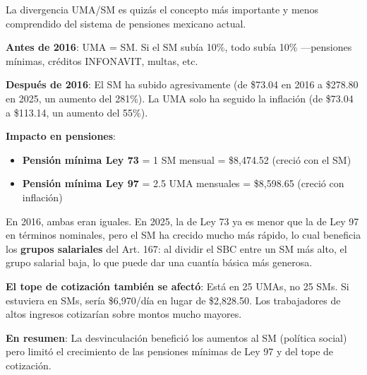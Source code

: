 \documentclass[11pt,a4paper]{report}
\begin{document}
\begin{tcolorbox}[colback=green!5!white, colframe=green!50!black, title=\textbf{Intuici\'on}]
La divergencia UMA/SM es quiz\'as el concepto m\'as importante y menos comprendido del sistema de pensiones mexicano actual.

\textbf{Antes de 2016}: UMA = SM. Si el SM sub\'ia 10\%, todo sub\'ia 10\% ---pensiones m\'inimas, cr\'editos INFONAVIT, multas, etc.

\textbf{Despu\'es de 2016}: El SM ha subido agresivamente (de \$73.04 en 2016 a \$278.80 en 2025, un aumento del 281\%). La UMA solo ha seguido la inflaci\'on (de \$73.04 a \$113.14, un aumento del 55\%).

\textbf{Impacto en pensiones}:
\begin{itemize}[nosep]
\item \textbf{Pensi\'on m\'inima Ley 73} = 1 SM mensual = \$8,474.52 (creci\'o con el SM)
\item \textbf{Pensi\'on m\'inima Ley 97} = 2.5 UMA mensuales = \$8,598.65 (creci\'o con inflaci\'on)
\end{itemize}

En 2016, ambas eran iguales. En 2025, la de Ley 73 ya es menor que la de Ley 97 en t\'erminos nominales, pero el SM ha crecido mucho m\'as r\'apido, lo cual beneficia los \textbf{grupos salariales} del Art. 167: al dividir el SBC entre un SM m\'as alto, el grupo salarial baja, lo que puede dar una cuant\'ia b\'asica m\'as generosa.

\textbf{El tope de cotizaci\'on tambi\'en se afect\'o}: Est\'a en 25 UMAs, no 25 SMs. Si estuviera en SMs, ser\'ia \$6,970/d\'ia en lugar de \$2,828.50. Los trabajadores de altos ingresos cotizar\'ian sobre montos mucho mayores.

\textbf{En resumen}: La desvinculaci\'on benefici\'o los aumentos al SM (pol\'itica social) pero limit\'o el crecimiento de las pensiones m\'inimas de Ley 97 y del tope de cotizaci\'on.
\end{tcolorbox}
\end{document}
